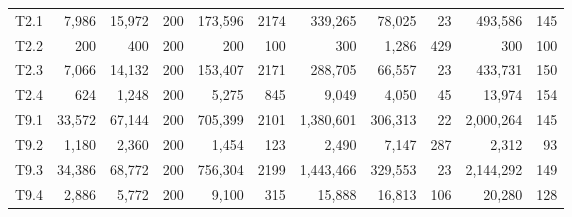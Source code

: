 \begin{table}[!htbp]
\begin{tabular}{@{}lrrrrrrrrrr@{}}
T2.1 & 7,986 & 15,972 & 200 & 173,596 & 2174 & 339,265 & 78,025 & 23 & 493,586 & 145 \\
T2.2 & 200 & 400 & 200 & 200 & 100 & 300 & 1,286 & 429 & 300 & 100 \\
T2.3 & 7,066 & 14,132 & 200 & 153,407 & 2171 & 288,705 & 66,557 & 23 & 433,731 & 150 \\
T2.4 & 624 & 1,248 & 200 & 5,275 & 845 & 9,049 & 4,050 & 45 & 13,974 & 154 \\
T9.1 & 33,572 & 67,144 & 200 & 705,399 & 2101 & 1,380,601 & 306,313 & 22 & 2,000,264 & 145 \\
T9.2 & 1,180 & 2,360 & 200 & 1,454 & 123 & 2,490 & 7,147 & 287 & 2,312 & 93 \\
T9.3 & 34,386 & 68,772 & 200 & 756,304 & 2199 & 1,443,466 & 329,553 & 23 & 2,144,292 & 149 \\
T9.4 & 2,886 & 5,772 & 200 & 9,100 & 315 & 15,888 & 16,813 & 106 & 20,280 & 128 \\
\bottomrule
\end{tabular}
\end{table}

